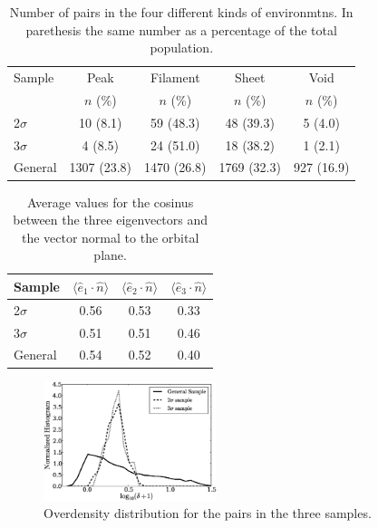 \documentclass{emulateapj}
\begin{document}
\begin{table}
\begin{center}
\begin{tabular}{lcccc}\hline\hline
Sample & Peak & Filament & Sheet & Void\\
       & $n$ (\%) & $n$ (\%) & $n$ (\%) & $n$ (\%) \\\hline
2$\sigma$ & 10 (8.1) & 59 (48.3) & 48 (39.3) & 5 (4.0)\\  
3$\sigma$ & 4 (8.5) & 24 (51.0) &  18 (38.2) & 1 (2.1)\\
General & 1307 (23.8) & 1470 (26.8) & 1769 (32.3) & 927 (16.9)\\\hline
\end{tabular}
\caption{
Number of pairs in the four different kinds of environmtns. In
parethesis the same number as a percentage of the
total population. 
\label{table:web_type}}
\end{center}
\end{table}




\begin{table}
\begin{center}
\begin{tabular}{lccc}\hline\hline
Sample & $\langle\hat{e}_1\cdot \hat{n}\rangle$ & $\langle\hat{e}_2\cdot \hat{n}\rangle$ & $\langle\hat{e}_3\cdot \hat{n}\rangle$\\\hline
2$\sigma$ & 0.56 & 0.53 &  0.33\\
3$\sigma$ & 0.51 & 0.51 &  0.46\\
General & 0.54 & 0.52 & 0.40\\\hline
\end{tabular}
\caption{Average values for the cosinus between the three eigenvectors and the vector normal to the orbital plane.
\label{table:mu}}
\end{center}
\end{table}


\begin{figure}
\begin{center}
  \includegraphics[width=0.45\textwidth]{density_histogram.eps}
\end{center}
\caption{Overdensity distribution for the pairs in the three samples.
    \label{fig:density}}  
\end{figure}
\end{document}
